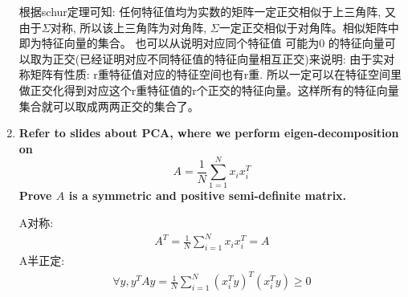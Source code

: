 \documentclass[paper=a4, fontsize=11pt]{scrartcl} %
\numberwithin{equation}{section} %
\numberwithin{figure}{section} %
\numberwithin{table}{section} %
\begin{document}
\begin{enumerate}[a]
  根据schur定理可知: 任何特征值均为实数的矩阵一定正交相似于上三角阵, 又由于$\Sigma$对称, 所以该上三角阵为对角阵, $\Sigma$一定正交相似于对角阵。相似矩阵中即为特征向量的集合。
  也可以从说明对应同个特征值 \(可能为0\) 的特征向量可以取为正交(已经证明对应不同特征值的特征向量相互正交)来说明: 由于实对称矩阵有性质: r重特征值对应的特征空间也有r重. 所以一定可以在特征空间里做正交化得到对应这个r重特征值的r个正交的特征向量。这样所有的特征向量集合就可以取成两两正交的集合了。

\item \textbf{Refer to slides about PCA, where we perform eigen-decomposition on}
  \[
  A = \frac{1}{N} \displaystyle \sum_{1=1}^{N} x_i x_i^T
  \]
  \textbf{Prove $A$ is a symmetric and positive semi-definite matrix.}

  A对称:
  \[
  \begin{split}
    A^T = \frac{1}{N} \displaystyle\sum_{i=1}^{N} x_i x_i^T = A
  \end{split}
  \]
  A半正定:
  \[
  \begin{split}
    \forall y, y^T A y = \frac{1}{N} \displaystyle\sum_{i=1}^{N} (x_i^T y)^T (x_i^T y) \geq 0
  \end{split}
  \]
\end{enumerate}

\end{document}
